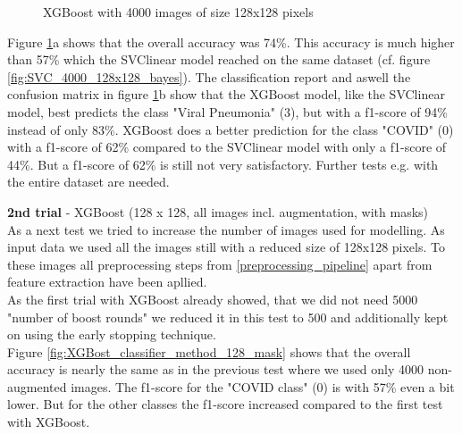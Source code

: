\documentclass{article}
\begin{document}
\begin{figure}[!ht]
  \centering
  \qquad
  \caption{XGBoost with 4000 images of size 128x128 pixels}
  \label{fig:XGBoost_128_no_aug_mask}
\end{figure}

Figure \ref{fig:XGBoost_128_no_aug_mask}a shows that the overall accuracy was 74\%. This accuracy is much higher than 57\% which the SVClinear model reached on
the same dataset (cf. figure \ref{fig:SVC_4000_128x128_bayes}). The classification report and aswell the confusion matrix in figure \ref{fig:XGBoost_128_no_aug_mask}b 
show that the XGBoost model, like the SVClinear model, best predicts the class "Viral Pneumonia" (3), 
but with a f1-score of 94\% instead of only 83\%. XGBoost does a better prediction for the class "COVID" (0) with a f1-score of 62\% compared to the SVClinear model
with only a f1-score of 44\%. But a f1-score of 62\% is still not very satisfactory. Further tests e.g. with the entire dataset are needed. 

\textbf{2nd trial} - XGBoost (128 x 128, all images incl. augmentation, with masks)\\
As a next test we tried to increase the number of images used for modelling. As input data we used all the images still with a reduced size of 128x128 pixels. 
To these images all preprocessing steps from \ref{preprocessing_pipeline} apart from feature extraction have been apllied.\\
As the first trial with XGBoost already showed, that we did not need 5000 "number of boost rounds" we reduced it in this test to 500 and additionally kept on 
using the early stopping technique. \\
Figure \ref{fig:XGBost_classifier_method_128_mask} shows that the overall accuracy is nearly the same as in the previous test where we used only 4000 non-augmented 
images. The f1-score for the "COVID class" (0) is with 57\% even a bit lower. But for the other classes the f1-score increased compared to the first test with XGBoost.\\
\end{document}
